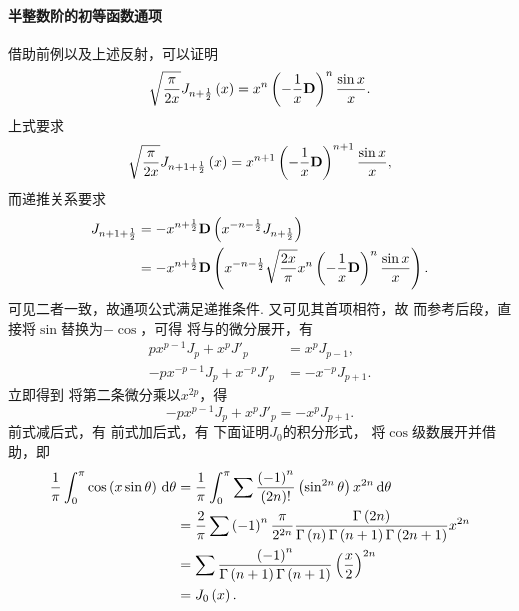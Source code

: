 \documentclass[UTF-8]{ctexart}
\begin{document}
  \paragraph{半整数阶的初等函数通项}借助前例以及上述反射，可以证明
  \[ \sqrt{\frac{\pi}{2x}}J_{n+\frac{1}{2}}\left(x\right)=x^n\left(-\frac{1}{x}\mathbf{D}\right)^n\frac{\sin x}{x}. \]
  上式要求
  \[ \sqrt{\frac{\pi}{2x}}J_{n+1+\frac{1}{2}} \left(x\right) = x^{n+1}\left(-\frac{1}{x}\mathbf{D}\right)^{n+1}\frac{\sin x}{x}, \]
  而递推关系要求
  \begin{align*}
    J_{n+1+\frac{1}{2}} &= -x^{n+\frac{1}{2}}\mathbf{D}\left(x^{-n-\frac{1}{2}}J_{n+\frac{1}{2}}\right) \\
    &= -x^{n+\frac{1}{2}}\mathbf{D}\left(x^{-n-\frac{1}{2}}\sqrt{\frac{2x}{\pi}}x^n\left(-\frac{1}{x}\mathbf{D}\right)^n\frac{\sin x}{x}\right).
  \end{align*}
  可见二者一致，故通项公式满足递推条件. 又可见其首项相符，故
  而参考后段，直接将$\sin$替换为$-\cos$，可得
  将与的微分展开，有
  \begin{align}
    px^{p-1}J_p+x^pJ'_p &= x^pJ_{p-1},\\
  \label{eq:jpd}
    -px^{-p-1}J_p + x^{-p}J'_p &= -x^{-p}J_{p+1}.
  \end{align}
  立即得到
  将第二条微分乘以$x^{2p}$，得
  \[ -px^{p-1}J_p + x^{p}J'_p = -x^{p}J_{p+1}. \]
  前式减后式，有
  前式加后式，有
  下面证明$J_0$的积分形式，
  将$\cos$级数展开并借助，即
  \begin{align*}
    \frac{1}{\pi}\int_0^{\pi} \cos\left(x\sin\theta\right) \,\mathrm{d} \theta &= \frac{1}{\pi}\int_0^{\pi} \sum \frac{\left(-1\right)^n}{\left(2n\right)!}\left(\sin^{2n}\theta\right) x^{2n} \,\mathrm{d} \theta \\
    &= \frac{2}{\pi}\sum \left(-1\right)^n\frac{\pi}{2^{2n}}\frac{\Gamma\left(2n\right)}{\Gamma\left(n\right)\Gamma\left(n+1\right)\Gamma\left(2n+1\right)} x^{2n}\\
    &= \sum \frac{\left(-1\right)^n}{\Gamma\left(n+1\right)\Gamma\left(n+1\right)}\left(\frac{x}{2}\right)^{2n} \\
    &= J_0\left(x\right).
  \end{align*}
\end{document}
